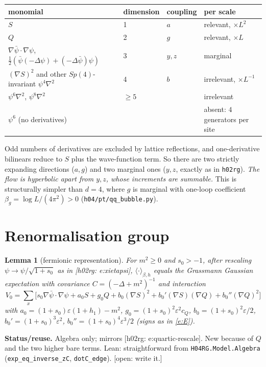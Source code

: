 \documentclass[11pt]{article}
\newtheorem{lemma}[theorem]{Lemma}
\theoremstyle{definition}
\theoremstyle{remark}
\newcommand{\avg}[1]{\langle #1\rangle}
\newcommand{\eps}{\varepsilon}
\newcommand{\bpsi}{\bar\psi}
\newcommand{\status}[1]{\par\smallskip\noindent\textbf{Status/reuse.} #1\par\smallskip}
\newcommand{\reuse}[1]{\textsf{[h02rg: #1]}}
\newcommand{\open}[1]{\textcolor{red!60!black}{\textsf{[open: #1]}}}
\begin{document}
\begin{center}
\begin{tabular}{llll}
  \toprule
  monomial & dimension & coupling & per scale\\
  \midrule
  $S$ & 1 & $a$ & relevant, $\times L^2$\\
  $Q$ & 2 & $g$ & relevant, $\times L$\\
  $\nabla\bpsi\cdot\nabla\psi$, $\tfrac12(\bpsi(-\Delta\psi)+(-\Delta\bpsi)\psi)$ & 3 & $y,z$ & marginal\\
  $(\nabla S)^2$ and other $Sp(4)$-invariant $\psi^4\nabla^2$ & 4 & $b$ & irrelevant, $\times L^{-1}$\\
  $\psi^6\nabla^2$, $\psi^8\nabla^2$ & $\ge5$ & & irrelevant\\
  $\psi^6$ (no derivatives) & & & absent: $4$ generators per site\\
  \bottomrule
\end{tabular}
\end{center}

\noindent Odd numbers of derivatives are excluded by lattice reflections, and one-derivative
bilinears reduce to $S$ plus the wave-function term. So there are two strictly expanding
directions ($a,g$) and two marginal ones ($y,z$, exactly as in \texttt{h02rg}).
\emph{The flow is hyperbolic apart from $y,z$, whose increments are summable.} This is
structurally simpler than $d=4$, where $g$ is marginal with one-loop coefficient
$\beta_g=\log L/(4\pi^2)>0$ (\texttt{h04/pt/qq\_bubble.py}).

\section{Renormalisation group}

\begin{lemma}[fermionic representation]\label{lem:psi}
  For $m^2\ge0$ and $s_0>-1$, after rescaling $\psi\to\psi/\sqrt{1+s_0}$ as in
  \reuse{e:xietapsi}, $\avg{\cdot}_{\beta,h}$ equals the Grassmann Gaussian expectation with
  covariance $C=(-\Delta+m^2)^{-1}$ and interaction
  \[
    V_0=\sum_x\Big[s_0\nabla\bpsi\cdot\nabla\psi+a_0S+g_0Q+b_0(\nabla S)^2+b_0'(\nabla S)(\nabla Q)+b_0''(\nabla Q)^2\Big]
  \]
  with $a_0=(1+s_0)\eps(1+h_1)-m^2$, $g_0=(1+s_0)^2\eps^2c_Q$,
  $b_0=(1+s_0)^2\eps/2$, $b_0'=(1+s_0)^3\eps^2$, $b_0''=(1+s_0)^4\eps^3/2$ (signs as in \eqref{e:E}).
\end{lemma}
\status{Algebra only; mirrors \reuse{e:quartic-rescale}. New because of $Q$ and the two higher
bare terms. Lean: straightforward from \texttt{H04RG.Model.Algebra} (\texttt{exp\_eq\_inverse\_zC},
\texttt{dotC\_edge}). \open{write it.}}
\end{document}
